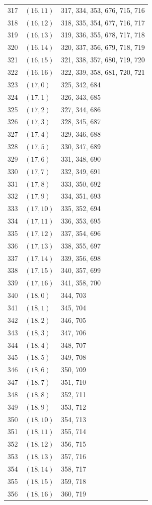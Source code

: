 \documentclass{article}
\begin{document}
\begin{longtable}{lll}
  317 & \((16, 11)\) & 317, 334, 353, 676, 715, 716 \\
  318 & \((16, 12)\) & 318, 335, 354, 677, 716, 717 \\
  319 & \((16, 13)\) & 319, 336, 355, 678, 717, 718 \\
  320 & \((16, 14)\) & 320, 337, 356, 679, 718, 719 \\
  321 & \((16, 15)\) & 321, 338, 357, 680, 719, 720 \\
  322 & \((16, 16)\) & 322, 339, 358, 681, 720, 721 \\
  323 & \((17, 0)\) & 325, 342, 684 \\
  324 & \((17, 1)\) & 326, 343, 685 \\
  325 & \((17, 2)\) & 327, 344, 686 \\
  326 & \((17, 3)\) & 328, 345, 687 \\
  327 & \((17, 4)\) & 329, 346, 688 \\
  328 & \((17, 5)\) & 330, 347, 689 \\
  329 & \((17, 6)\) & 331, 348, 690 \\
  330 & \((17, 7)\) & 332, 349, 691 \\
  331 & \((17, 8)\) & 333, 350, 692 \\
  332 & \((17, 9)\) & 334, 351, 693 \\
  333 & \((17, 10)\) & 335, 352, 694 \\
  334 & \((17, 11)\) & 336, 353, 695 \\
  335 & \((17, 12)\) & 337, 354, 696 \\
  336 & \((17, 13)\) & 338, 355, 697 \\
  337 & \((17, 14)\) & 339, 356, 698 \\
  338 & \((17, 15)\) & 340, 357, 699 \\
  339 & \((17, 16)\) & 341, 358, 700 \\
  340 & \((18, 0)\) & 344, 703 \\
  341 & \((18, 1)\) & 345, 704 \\
  342 & \((18, 2)\) & 346, 705 \\
  343 & \((18, 3)\) & 347, 706 \\
  344 & \((18, 4)\) & 348, 707 \\
  345 & \((18, 5)\) & 349, 708 \\
  346 & \((18, 6)\) & 350, 709 \\
  347 & \((18, 7)\) & 351, 710 \\
  348 & \((18, 8)\) & 352, 711 \\
  349 & \((18, 9)\) & 353, 712 \\
  350 & \((18, 10)\) & 354, 713 \\
  351 & \((18, 11)\) & 355, 714 \\
  352 & \((18, 12)\) & 356, 715 \\
  353 & \((18, 13)\) & 357, 716 \\
  354 & \((18, 14)\) & 358, 717 \\
  355 & \((18, 15)\) & 359, 718 \\
  356 & \((18, 16)\) & 360, 719 \\
\end{longtable}
\end{document}
